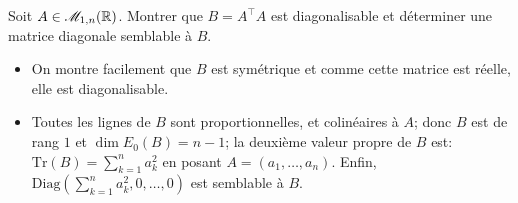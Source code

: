\begin{box_enonce}{}
    Soit $A \in \mathscr{M}_{1,n} (\mathbb{R})$. Montrer que $B = A^\top A$ est diagonalisable et déterminer une matrice diagonale semblable à $B$.
\end{box_enonce}

\begin{solution}
    \begin{itemize}
        \item On montre facilement que $B$ est symétrique et comme cette matrice est réelle, elle est diagonalisable.
        \item Toutes les lignes de $B$ sont proportionnelles, et colinéaires à $A$; donc $B$ est de rang $1$ et $\dim E_0(B) = n-1$; la deuxième valeur propre de $B$ est: $\mathrm{Tr}(B) = \sum\limits_{k = 1}^{n} a_k^2$ en posant $A = (a_1, \dots, a_n)$. Enfin, $\mathrm{Diag} \left(\sum\limits_{k = 1}^{n} a_k^2, 0, \dots, 0 \right)$ est semblable à $B$.
    \end{itemize}
\end{solution}
